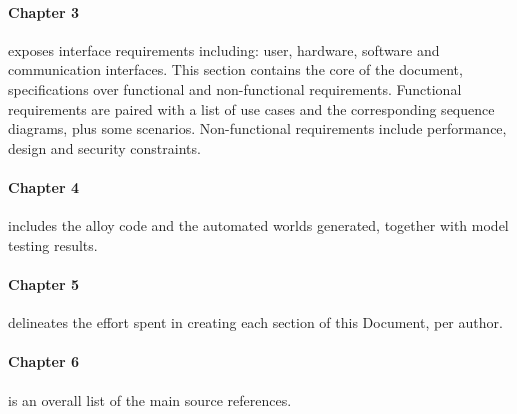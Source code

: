 \paragraph{Chapter 3}
exposes interface requirements including: user, hardware, software and communication interfaces. This section contains the core of the document, specifications over
functional and non-functional requirements. \newline
Functional requirements are paired with a list of use cases and the corresponding sequence diagrams, plus some scenarios. Non-functional requirements include performance, design and security constraints.


\paragraph{Chapter 4}
includes the alloy code and the automated worlds generated, together with model testing results.

\paragraph{Chapter 5}
 delineates the effort spent in creating each section of this Document, per author.

\paragraph{Chapter 6}
 is an overall list of the main source references.

